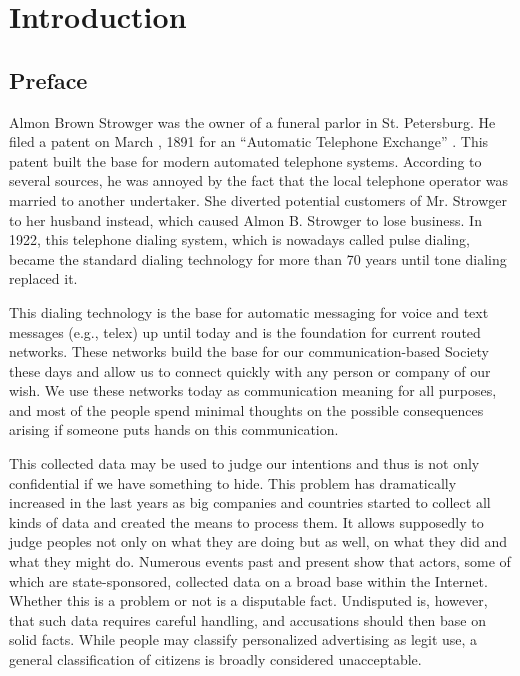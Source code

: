 

\part{Introduction}
\chapter{Preface}
Almon Brown Strowger was the owner of a funeral parlor in St. Petersburg. He filed a patent on March , 1891 for an ``Automatic Telephone Exchange'' \cite{pulseDialingPatent}. This patent built the base for modern automated telephone systems. According to several sources, he was annoyed by the fact that the local telephone operator was married to another undertaker. She diverted potential customers of Mr. Strowger to her husband instead, which caused Almon B. Strowger to lose business. In 1922, this telephone dialing system, which is nowadays called pulse dialing, became the standard dialing technology for more than 70 years until tone dialing replaced it.

This dialing technology is the base for automatic messaging for voice and text messages (e.g., telex) up until today and is the foundation for current routed networks. These networks build the base for our communication-based Society these days and allow us to connect quickly with any person or company of our wish. We use these networks today as communication meaning for all purposes, and most of the people spend minimal thoughts on the possible consequences arising if someone puts hands on this communication. 

This collected data may be used to judge our intentions and thus is not only confidential if we have something to hide. This problem has dramatically increased in the last years as big companies and countries started to collect all kinds of data and created the means to process them. It allows supposedly to judge peoples not only on what they are doing but as well, on what they did and what they might do. Numerous events past and present show that actors, some of which are state-sponsored, collected data on a broad base within the Internet. Whether this is a problem or not is a disputable fact. Undisputed is, however, that such data requires careful handling, and accusations should then base on solid facts. While people may classify personalized advertising as legit use, a general classification of citizens is broadly considered unacceptable\cite{NCR2013,XKeyscore,Ball2013,Greenberg2013,Leuenberger1989}.

